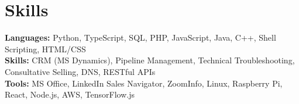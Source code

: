 \documentclass[11pt]{article}       %
\begin{document}

\vspace{-18.5pt}


\section*{Skills}
\textbf{Languages:} Python, TypeScript, SQL, PHP, JavaScript, Java, C++, Shell Scripting, HTML/CSS\\
\textbf{Skills:} CRM (MS Dynamics), Pipeline Management, Technical Troubleshooting, Consultative Selling, DNS, RESTful APIs\\
\textbf{Tools:} MS Office, LinkedIn Sales Navigator, ZoomInfo, Linux, Raspberry Pi, React, Node.js, AWS, TensorFlow.js\\

\vspace{-6.5pt}
\end{document}
